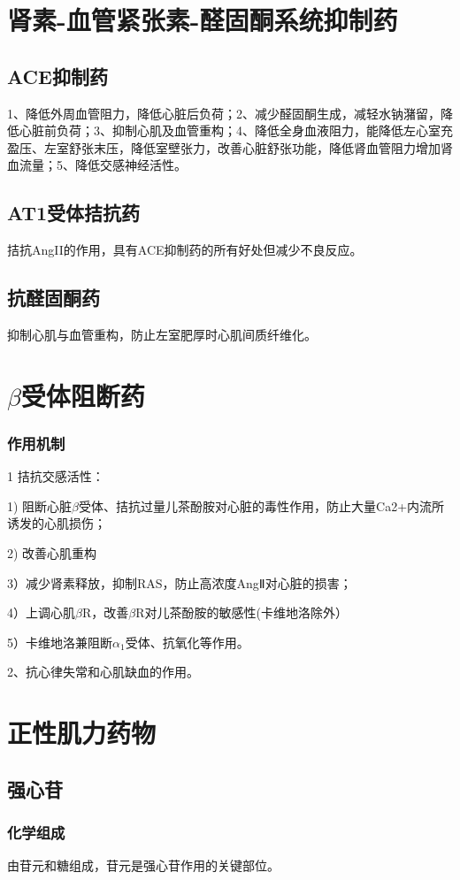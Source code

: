 \documentclass[UTF8]{ctexbook}
\begin{document}
\section{肾素-血管紧张素-醛固酮系统抑制药}
\subsection{ACE抑制药}
1、降低外周血管阻力，降低心脏后负荷；2、减少醛固酮生成，减轻水钠潴留，降低心脏前负荷；3、抑制心肌及血管重构；4、降低全身血液阻力，能降低左心室充盈压、左室舒张末压，降低室壁张力，改善心脏舒张功能，降低肾血管阻力增加肾血流量；5、降低交感神经活性。
\subsection{AT1受体拮抗药}
拮抗AngII的作用，具有ACE抑制药的所有好处但减少不良反应。
\subsection{抗醛固酮药}
抑制心肌与血管重构，防止左室肥厚时心肌间质纤维化。
\section{\(\beta\)受体阻断药}
\subsubsection{作用机制}
1 拮抗交感活性：

1) 阻断心脏\(\beta\)受体、拮抗过量儿茶酚胺对心脏的毒性作用，防止大量Ca2+内流所诱发的心肌损伤；

2) 改善心肌重构

3）减少肾素释放，抑制RAS，防止高浓度AngⅡ对心脏的损害；

4）上调心肌\(\beta\)R，改善\(\beta\)R对儿茶酚胺的敏感性(卡维地洛除外）

5）卡维地洛兼阻断\(\alpha_{1}\)受体、抗氧化等作用。

2、抗心律失常和心肌缺血的作用。
\section{正性肌力药物}
\subsection{强心苷}
\subsubsection{化学组成}
由苷元和糖组成，苷元是强心苷作用的关键部位。
\end{document}

